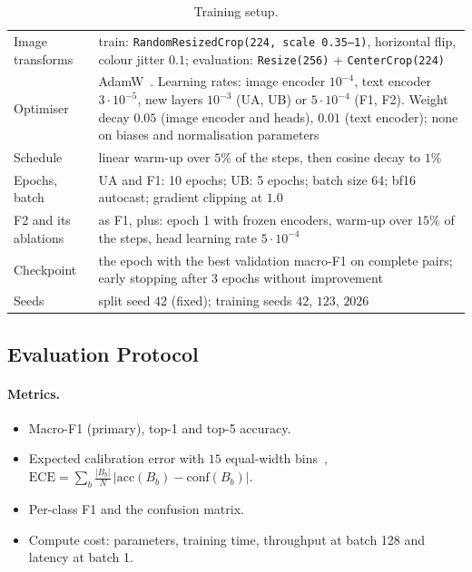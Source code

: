 \begin{table}[H]
  \centering\small
  \caption{Training setup.}
  \label{tab:setup}
  \begin{tabularx}{\linewidth}{@{}lY@{}}
    \toprule
    Image transforms & train: \texttt{RandomResizedCrop(224, scale 0.35--1)}, horizontal flip, colour jitter $0.1$; evaluation: \texttt{Resize(256)} + \texttt{CenterCrop(224)} \\
    Optimiser & AdamW~\cite{loshchilov2019adamw}. Learning rates: image encoder $10^{-4}$, text encoder $3\cdot10^{-5}$, new layers $10^{-3}$ (UA, UB) or $5\cdot10^{-4}$ (F1, F2). Weight decay $0.05$ (image encoder and heads), $0.01$ (text encoder); none on biases and normalisation parameters \\
    Schedule & linear warm-up over $5\%$ of the steps, then cosine decay to $1\%$ \\
    Epochs, batch & UA and F1: 10 epochs; UB: 5 epochs; batch size 64; bf16 autocast; gradient clipping at $1.0$ \\
    F2 and its ablations & as F1, plus: epoch 1 with frozen encoders, warm-up over $15\%$ of the steps, head learning rate $5\cdot10^{-4}$ \\
    Checkpoint & the epoch with the best validation macro-F1 on complete pairs; early stopping after 3 epochs without improvement \\
    Seeds & split seed $42$ (fixed); training seeds $42$, $123$, $2026$ \\
    \bottomrule
  \end{tabularx}
\end{table}

\subsection{Evaluation Protocol}
\label{sec:protocol}

\paragraph{Metrics.}
\begin{itemize}
  \item Macro-F1 (primary), top-1 and top-5 accuracy.
  \item Expected calibration error with $15$ equal-width bins~\cite{guo2017calibration},
        $\mathrm{ECE}=\sum_b \frac{|B_b|}{N}\,|\mathrm{acc}(B_b)-\mathrm{conf}(B_b)|$.
  \item Per-class F1 and the confusion matrix.
  \item Compute cost: parameters, training time, throughput at batch 128 and latency at batch 1.
\end{itemize}

